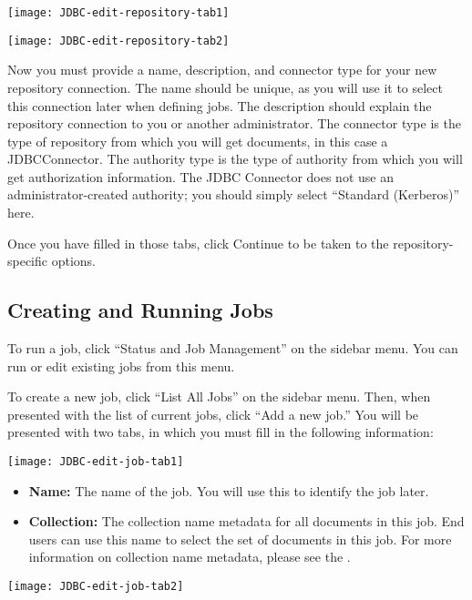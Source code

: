 \begin{changemargin}{1.5in}{0in}
\texttt{[image: JDBC-edit-repository-tab1]}

\texttt{[image: JDBC-edit-repository-tab2]}



Now you must provide a name, description, and connector type for your
new repository connection. The name should be unique, as you will use
it to select this connection later when defining jobs. The description
should explain the repository connection to you or another
administrator.  The connector type is the type of repository from
which you will get documents, in this case a JDBCConnector. The
authority type is the type of authority from which you will get
authorization information. The JDBC Connector does not use an
administrator-created authority; you should simply select ``Standard
(Kerberos)'' here.

Once you have filled in those tabs, click Continue to be taken to the
repository-specific options.



\subsection{Creating and Running Jobs}

To run a job, click ``Status and Job Management'' on the sidebar menu.
You can run or edit existing jobs from this menu.

To create a new job, click ``List All Jobs'' on the sidebar menu. Then, when
presented with the list of current jobs, click ``Add a new job.'' You
will be presented with two tabs, in which you must fill in the following
information:

\texttt{[image: JDBC-edit-job-tab1]}

\begin{itemize}

\item \textbf{Name:} The name of the job. You will use this to identify
the job later.

\item \textbf{Collection:} The collection name metadata for all
documents in this job. End users can use this name to select the set
of documents in this job. For more information on collection name
metadata, please see the .

\end{itemize}

\texttt{[image: JDBC-edit-job-tab2]}


\end{changemargin}
